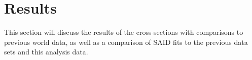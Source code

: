 \section{Results}\label{sec:results}
This section will discuss the results of the cross-sections with comparisons to previous world data, as well as a comparison of SAID fits to the previous data sets and this analysis data.



 